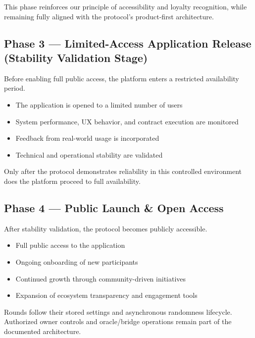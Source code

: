 \documentclass[
  10pt,
  letterpaper,
]{article}
\providecommand{\tightlist}{%
  \setlength{\itemsep}{0pt}\setlength{\parskip}{0pt}}
\begin{document}
This phase reinforces our principle of accessibility and loyalty
recognition, while remaining fully aligned with the protocol's
product-first architecture.

\subsection{Phase 3 --- Limited-Access Application Release (Stability
Validation
Stage)}\label{phase-3-limited-access-application-release-stability-validation-stage}

Before enabling full public access, the platform enters a restricted
availability period.

\begin{itemize}
\tightlist
\item
  The application is opened to a limited number of users
\item
  System performance, UX behavior, and contract execution are monitored
\item
  Feedback from real-world usage is incorporated
\item
  Technical and operational stability are validated
\end{itemize}

Only after the protocol demonstrates reliability in this controlled
environment does the platform proceed to full availability.

\subsection{Phase 4 --- Public Launch \& Open
Access}\label{phase-4-public-launch-open-access}

After stability validation, the protocol becomes publicly accessible.

\begin{itemize}
\tightlist
\item
  Full public access to the application
\item
  Ongoing onboarding of new participants
\item
  Continued growth through community-driven initiatives
\item
  Expansion of ecosystem transparency and engagement tools
\end{itemize}

Rounds follow their stored settings and asynchronous randomness
lifecycle. Authorized owner controls and oracle/bridge operations remain
part of the documented architecture.
\end{document}
